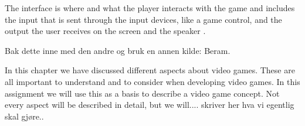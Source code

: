 The interface is where and what the player interacts with the game and includes the input that is sent through the input devices, like a game control, and the output the user receives on the screen and the speaker \cite{umlapproach}.

Bak dette inne med den andre og bruk en annen kilde: Beram. 

In this chapter we have discussed different aspects about video games. These are all important to understand and to consider when developing video games. In this assignment we will use this as a basis to describe a video game concept. Not every aspect will be described in detail, but we will.... skriver her hva vi egentlig skal gjøre.. 

